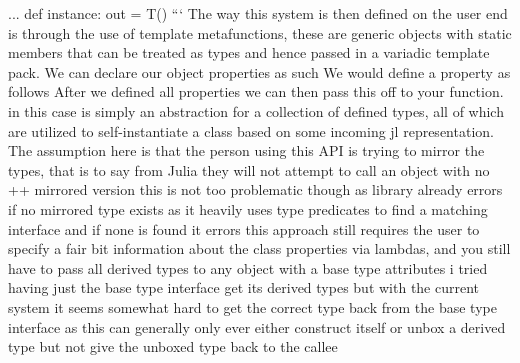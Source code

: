 {}... def instance: out = T()\markdownRendererInterblockSeparator
{}\markdownRendererInterblockSeparator
{}```\markdownRendererInterblockSeparator
{}\markdownRendererInterblockSeparator
{}The way this system is then defined on the user end is through the use of template metafunctions, these are generic objects with static members that can be treated as types and hence passed in a variadic template pack. \markdownRendererInterblockSeparator
{}We can declare our object properties as such  We would define a property as follows  After we defined all properties we can then pass this off to your  function.   in this case is simply an abstraction for a collection of defined  types, all of which are utilized to self-instantiate a class based on some incoming jl representation.\markdownRendererInterblockSeparator
{}\markdownRendererInterblockSeparator
{}The assumption here is that the person using this API is trying to mirror the types, that is to say from Julia they will not attempt to call an object with no ++ mirrored version this is not too problematic though as library already errors if no mirrored type exists as it heavily uses type predicates to find a matching interface and if none is found it errors this approach still requires the user to specify a fair bit information about the class properties via lambdas, and you still have to pass all derived types to any object with a base type attributes i tried having just the base type interface get its derived types but with the current system it seems somewhat hard to get the correct type back from the base type interface as this can generally only ever either construct itself or unbox a derived type but not give the unboxed type back to the callee\markdownRendererInterblockSeparator
